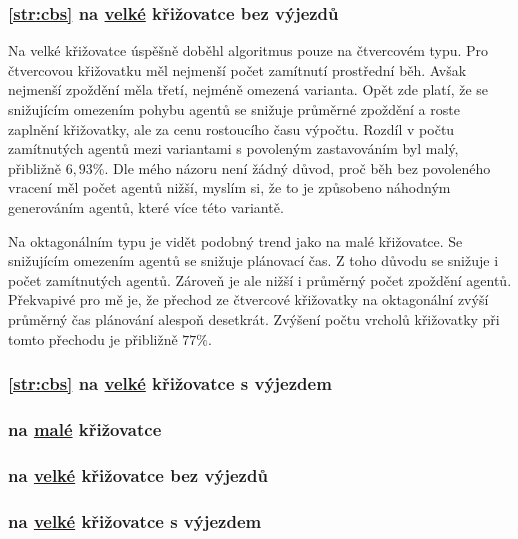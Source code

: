 \subsubsection{\ref{str:cbs} na \hyperref[par:data_velka]{velké} křižovatce bez výjezdů}
\label{subsubsec:exp_cbssg_velka_krizovatka_bez_vyjezdu}

Na velké křižovatce úspěšně doběhl algoritmus pouze na čtvercovém typu.
Pro čtvercovou křižovatku měl nejmenší počet zamítnutí prostřední běh.
Avšak nejmenší zpoždění měla třetí, nejméně omezená varianta.
Opět zde platí, že se snižujícím omezením pohybu agentů se snižuje průměrné zpoždění
a roste zaplnění křižovatky, ale za cenu rostoucího času výpočtu.
Rozdíl v počtu zamítnutých agentů mezi variantami s povoleným zastavováním byl malý, přibližně $6,93\%$.
Dle mého názoru není žádný důvod, proč běh bez povoleného vracení měl počet agentů nižší,
myslím si, že to je způsobeno náhodným generováním agentů, které více  této variantě.

Na oktagonálním typu je vidět podobný trend jako na malé křižovatce.
Se snižujícím omezením agentů se snižuje plánovací čas.
Z toho důvodu se snižuje i počet zamítnutých agentů.
Zároveň je ale nižší i průměrný počet zpoždění agentů.
Překvapivé pro mě je, že přechod ze čtvercové křižovatky na oktagonální zvýší průměrný čas plánování alespoň desetkrát.
Zvýšení počtu vrcholů křižovatky při tomto přechodu je přibližně $77\%$.





\subsubsection{\ref{str:cbs} na \hyperref[par:data_velka]{velké} křižovatce s výjezdem}
\label{subsubsec:exp_cbssg_velka_krizovatka_s_vyjezdem}

\subsubsection{ na \hyperref[par:data_mala]{malé} křižovatce}
\label{subsubsec:exp_cbsoid_mala_krizovatka}


\subsubsection{ na \hyperref[par:data_velka]{velké} křižovatce bez výjezdů}
\label{subsubsec:exp_cbsoid_velka_krizovatka_bez_vyjezdu}


\subsubsection{ na \hyperref[par:data_velka]{velké} křižovatce s výjezdem}
\label{subsubsec:exp_cbsoid_velka_krizovatka_s_vyjezdem}

